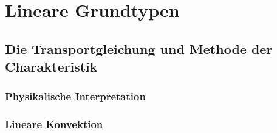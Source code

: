 \chapter*{Lineare Grundtypen}
\section{Die Transportgleichung und Methode der Charakteristik}

\subsection{Physikalische Interpretation}

\subsection{Lineare Konvektion}
